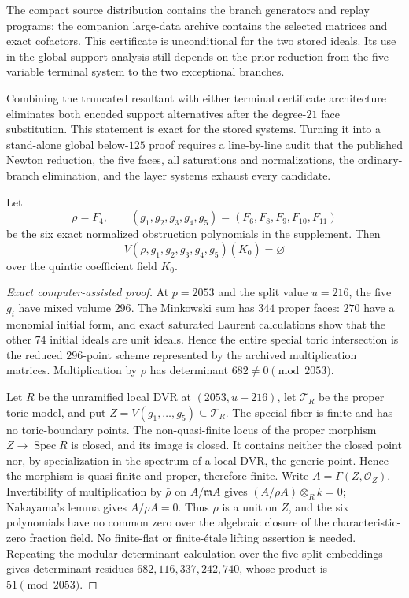 The compact source distribution contains the branch generators and replay
programs; the companion large-data archive contains the selected matrices
and exact cofactors.  This certificate is unconditional for the two stored
ideals.  Its use in the global support analysis still depends on the prior
reduction from the five-variable terminal system to the two exceptional
branches.

Combining the truncated resultant with either terminal certificate
architecture eliminates both encoded support alternatives after the
degree-\(21\) face substitution.  This statement is exact for the stored
systems.  Turning it into a stand-alone global below-\(125\) proof requires a
line-by-line audit that the published Newton reduction, the five faces, all
saturations and normalizations, the ordinary-branch elimination, and the
layer systems exhaust every candidate.

\begin{theorem}
\label{thm:terminal-toric-certificate}
Let
\[
\rho=F_4,\qquad(g_1,g_2,g_3,g_4,g_5)
=(F_6,F_8,F_9,F_{10},F_{11})
\]
be the six exact normalized obstruction polynomials in the supplement.
Then
\[
V(\rho,g_1,g_2,g_3,g_4,g_5)(\overline {K_0})=\varnothing
\]
over the quintic coefficient field \(K_0\).
\end{theorem}

\begin{proof}[Exact computer-assisted proof]
At \(p=2053\) and the split value \(u=216\), the five \(g_i\) have mixed
volume \(296\).  The Minkowski sum has \(344\) proper faces: \(270\) have a
monomial initial form, and exact saturated Laurent calculations show that
the other \(74\) initial ideals are unit ideals.  Hence the entire special
toric intersection is the reduced \(296\)-point scheme represented by the
archived multiplication matrices.  Multiplication by \(\rho\) has
determinant \(682\ne0\pmod{2053}\).

Let \(R\) be the unramified local DVR at \((2053,u-216)\), let
\(\mathcal T_R\) be the proper toric model, and put
\(Z=V(g_1,\ldots,g_5)\subseteq\mathcal T_R\).  The special fiber is finite
and has no toric-boundary points.  The non-quasi-finite locus of the proper
morphism \(Z\to\operatorname{Spec}R\) is closed, and its image is closed.  It
contains neither the closed point nor, by specialization in the spectrum of
a local DVR, the generic point.  Hence the morphism is quasi-finite and
proper, therefore finite.  Write \(A=\Gamma(Z,\mathcal O_Z)\).  Invertibility
of multiplication by \(\bar\rho\) on \(A/\mathfrak mA\) gives
\((A/\rho A)\otimes_R k=0\); Nakayama's lemma gives \(A/\rho A=0\).
Thus \(\rho\) is a unit on \(Z\), and the six polynomials have no common
zero over the algebraic closure of the characteristic-zero fraction field.
No finite-flat or finite-\'{e}tale lifting assertion is needed.  Repeating
the modular determinant calculation over the five split embeddings gives
determinant residues \(682,116,337,242,740\), whose product is
\(51\pmod{2053}\).
\end{proof}

